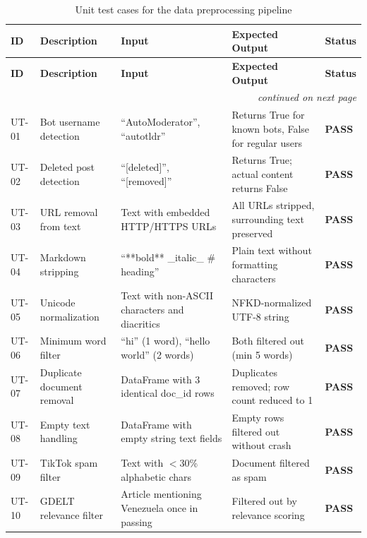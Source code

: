 \documentclass[12pt, letterpaper]{article}
\begin{document}
\begin{longtable}{p{1cm} p{3.8cm} p{3.2cm} p{3.2cm} p{1.5cm}}
  \caption{Unit test cases for the data preprocessing pipeline}
  \label{tab:unit_tests_pipeline} \\
  \toprule
  \textbf{ID} & \textbf{Description} & \textbf{Input} & \textbf{Expected Output} & \textbf{Status} \\
  \midrule
  \endfirsthead
  \toprule
  \textbf{ID} & \textbf{Description} & \textbf{Input} & \textbf{Expected Output} & \textbf{Status} \\
  \midrule
  \endhead
  \midrule \multicolumn{5}{r}{\itshape continued on next page} \\
  \endfoot
  \bottomrule
  \endlastfoot
  UT-01 & Bot username detection & ``AutoModerator'', ``autotldr'' & Returns True for known bots, False for regular users & \textcolor{commentgreen}{\textbf{PASS}} \\[4pt]
  UT-02 & Deleted post detection & ``[deleted]'', ``[removed]'' & Returns True; actual content returns False & \textcolor{commentgreen}{\textbf{PASS}} \\[4pt]
  UT-03 & URL removal from text & Text with embedded HTTP/HTTPS URLs & All URLs stripped, surrounding text preserved & \textcolor{commentgreen}{\textbf{PASS}} \\[4pt]
  UT-04 & Markdown stripping & ``**bold** \_italic\_ \# heading'' & Plain text without formatting characters & \textcolor{commentgreen}{\textbf{PASS}} \\[4pt]
  UT-05 & Unicode normalization & Text with non-ASCII characters and diacritics & NFKD-normalized UTF-8 string & \textcolor{commentgreen}{\textbf{PASS}} \\[4pt]
  UT-06 & Minimum word filter & ``hi'' (1 word), ``hello world'' (2 words) & Both filtered out (min 5 words) & \textcolor{commentgreen}{\textbf{PASS}} \\[4pt]
  UT-07 & Duplicate document removal & DataFrame with 3 identical doc\_id rows & Duplicates removed; row count reduced to 1 & \textcolor{commentgreen}{\textbf{PASS}} \\[4pt]
  UT-08 & Empty text handling & DataFrame with empty string text fields & Empty rows filtered out without crash & \textcolor{commentgreen}{\textbf{PASS}} \\[4pt]
  UT-09 & TikTok spam filter & Text with $<$30\% alphabetic chars & Document filtered as spam & \textcolor{commentgreen}{\textbf{PASS}} \\[4pt]
  UT-10 & GDELT relevance filter & Article mentioning Venezuela once in passing & Filtered out by relevance scoring & \textcolor{commentgreen}{\textbf{PASS}} \\
\end{longtable}
\end{document}
